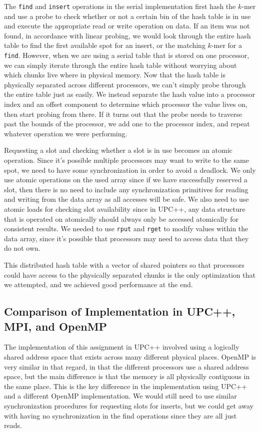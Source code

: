\documentclass{article}
\begin{document}
The \verb|find| and \verb|insert| operations in the serial implementation first hash the $k$-mer and use a probe to check whether or not a certain bin of the hash table is in use and execute the appropriate read or write operation on data. If an item was not found, in accordance with linear probing, we would look through the entire hash table to find the first available spot for an insert, or the matching $k$-mer for a \verb|find|. However, when we are using a serial table that is stored on one processor, we can simply iterate through the entire hash table without worrying about which chunks live where in physical memory. Now that the hash table is physically separated across different processors, we can’t simply probe through the entire table just as easily. We instead separate the hash value into a processor index and an offset component to determine which processor the value lives on, then start probing from there. If it turns out that the probe needs to traverse past the bounds of the processor, we add one to the processor index, and repeat whatever operation we were performing.

Requesting a slot and checking whether a slot is in use becomes an atomic operation. Since it’s possible multiple processors may want to write to the same spot, we need to have some synchronization in order to avoid a deadlock. We only use atomic operations on the used array since if we have successfully reserved a slot, then there is no need to include any synchronization primitives for reading and writing from the data array as all accesses will be safe. We also need to use atomic loads for checking slot availability since in UPC++, any data structure that is operated on atomically should always only be accessed atomically for consistent results. We needed to use \verb|rput| and \verb|rget| to modify values within the data array, since it’s possible that processors may need to access data that they do not own.

This distributed hash table with a vector of shared pointers so that processors could have access to the physically separated chunks is the only optimization that we attempted, and we achieved good performance at the end. 

\subsection{Comparison of Implementation in UPC++, MPI, and OpenMP}

The implementation of this assignment in UPC++ involved using a logically shared address space that exists across many different physical places. OpenMP is very similar in that regard, in that the different processors use a shared address space, but the main difference is that the memory is all physically contiguous in the same place. This is the key difference in the implementation using UPC++ and a different OpenMP implementation. We would still need to use similar synchronization procedures for requesting slots for inserts, but we could get away with having no synchronization in the find operations since they are all just reads.
\end{document}
